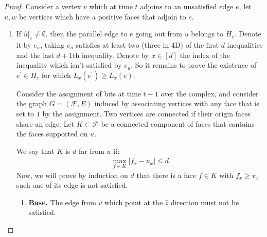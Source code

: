 \begin{proof}
  Consider a vertex $v$ which at time $t$ adjoins to an unsatisfied edge $e$, let $u,w$ be vertices which have a positive faces that adjoin to $e$. 
  \begin{enumerate}
    \item If $\hat{u}|_{e} \neq \emptyset$, then the parallel edge to $e$ going out from $u$ belongs to $H_{e}$. Denote it by $e_u$, taking $e_{u}$ satisfies at least two (three in 4D) of the first $d$ inequalities and the last $d+1$th inequality. Denote by $x \in [d]$ the index of the inequality which isn't satisfied by $e_{u}$. So it remains to prove the existence of $e^{\prime} \in H_{e}$ for which $L_x(e^{\prime}) \ge L_{x}(e)$.

Consider the assignment of bits at time $t-1$ over the complex, and consider the graph $G = \left( \mathcal{F}, E \right)$ induced by associating vertices with any face that is set to $1$ by the assignment. Two vertices are connected if their origin faces share an edge. Let $K \subset \mathcal{F}$ be a connected component of faces that contains the faces supported on $u$.

      We say that $K$ is $d$ far from $u$ if:   
      \begin{equation*}
        \begin{split}
          \max_{f \in K} | f_{x} - u_{x} | \le d
        \end{split}
      \end{equation*}
      Now, we will prove by induction on $d$ that there is a face $f \in K$ with $f_{x} \ge v_{x}$ such one of its edge is not satisfied. 
      \begin{enumerate}
        \item \textbf{Base.} The edge from $v$ which point at the $\hat{z}$ direction must not be satisfied.  

\begin{figure}[h]
  \centering
\end{figure}
\end{enumerate}
\end{enumerate}
\end{proof}

